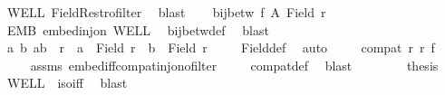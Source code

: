\begin{isabellebody}
\ WELL\ Field{\isacharunderscore}{\kern0pt}Restr{\isacharunderscore}{\kern0pt}ofilter\ \isamarkupfalse%
\ blast\isanewline
\ \ \isamarkupfalse%
\ {\isachardoublequoteopen}bij{\isacharunderscore}{\kern0pt}betw\ f\ {\isacharquery}{\kern0pt}A{\isacharprime}{\kern0pt}\ {\isacharparenleft}{\kern0pt}Field\ {\isacharquery}{\kern0pt}r{\isacharprime}{\kern0pt}{\isacharprime}{\kern0pt}{\isacharparenright}{\kern0pt}{\isachardoublequoteclose}\isanewline
\ \ \isamarkupfalse%
\ EMB\ embed{\isacharunderscore}{\kern0pt}inj{\isacharunderscore}{\kern0pt}on\ WELL{\isacharprime}{\kern0pt}\ \isamarkupfalse%
\ bij{\isacharunderscore}{\kern0pt}betw{\isacharunderscore}{\kern0pt}def\ \isamarkupfalse%
\ blast\isanewline
\ \ \isamarkupfalse%
\isanewline
\ \ \isacommand{{\isacharbraceleft}{\kern0pt}}\isamarkupfalse%
\isamarkupfalse%
\ {\isachardoublequoteopen}{\isasymforall}a\ b{\isachardot}{\kern0pt}\ {\isacharparenleft}{\kern0pt}a{\isacharcomma}{\kern0pt}b{\isacharparenright}{\kern0pt}\ {\isasymin}\ r{\isacharprime}{\kern0pt}\ {\isasymlongrightarrow}\ a\ {\isasymin}\ Field\ r{\isacharprime}{\kern0pt}\ {\isasymand}\ b\ {\isasymin}\ Field\ r{\isacharprime}{\kern0pt}{\isachardoublequoteclose}\isanewline
\ \ \ \isamarkupfalse%
\ Field{\isacharunderscore}{\kern0pt}def\ \isamarkupfalse%
\ auto\isanewline
\ \ \ \isamarkupfalse%
\ {\isachardoublequoteopen}compat\ r{\isacharprime}{\kern0pt}\ {\isacharquery}{\kern0pt}r{\isacharprime}{\kern0pt}{\isacharprime}{\kern0pt}\ f{\isachardoublequoteclose}\isanewline
\ \ \ \isamarkupfalse%
\ assms\ embed{\isacharunderscore}{\kern0pt}iff{\isacharunderscore}{\kern0pt}compat{\isacharunderscore}{\kern0pt}inj{\isacharunderscore}{\kern0pt}on{\isacharunderscore}{\kern0pt}ofilter\isanewline
\ \ \ \isamarkupfalse%
\ compat{\isacharunderscore}{\kern0pt}def\ \isamarkupfalse%
\ blast\isanewline
\ \ \isacommand{{\isacharbraceright}{\kern0pt}}\isamarkupfalse%
\isanewline
\ \ \isamarkupfalse%
\ \isamarkupfalse%
\ {\isacharquery}{\kern0pt}thesis\ \isamarkupfalse%
\ WELL{\isacharprime}{\kern0pt}\ {}\ iso{\isacharunderscore}{\kern0pt}iff{}\ \isamarkupfalse%
\ blast\isanewline
{}\isamarkupfalse%
%
\endisatagproof
{\isafoldproof}%
%
\isadelimproof
%
\endisadelimproof
%
\isadelimdocument
%
\endisadelimdocument
%
\isatagdocument
%

\end{isabellebody}
